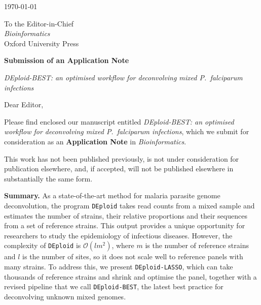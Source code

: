 \documentclass[11pt]{article}
\begin{document}
\today

\medskip

To the Editor-in-Chief\\
\emph{Bioinformatics}\\
Oxford University Press

\medskip

\noindent\textbf{Submission of an Application Note}

\noindent\textit{DEploid-BEST: an optimised workflow for deconvolving mixed
\emph{P.~falciparum} infections}

\medskip

Dear Editor,

Please find enclosed our manuscript entitled \emph{DEploid-BEST: an optimised
workflow for deconvolving mixed \emph{P.~falciparum} infections}, which we submit
for consideration as an \textbf{Application Note} in \emph{Bioinformatics}.

This work has not been published previously, is not under consideration for
publication elsewhere, and, if accepted, will not be published elsewhere in
substantially the same form.

\medskip

\noindent\textbf{Summary.}
As a state-of-the-art method for malaria parasite genome deconvolution, the
program \texttt{DEploid} takes read counts from a mixed sample and estimates the
number of strains, their relative proportions and their sequences from a set of
reference strains. This output provides a unique opportunity for researchers to
study the epidemiology of infectious diseases. However, the complexity of
\texttt{DEploid} is $\mathcal{O}(lm^{2})$, where $m$ is the number of reference
strains and $l$ is the number of sites, so it does not scale well to reference
panels with many strains. To address this, we present \texttt{DEploid-LASSO},
which can take thousands of reference strains and shrink and optimise the panel,
together with a revised pipeline that we call \texttt{DEploid-BEST}, the latest
best practice for deconvolving unknown mixed genomes.
\end{document}
